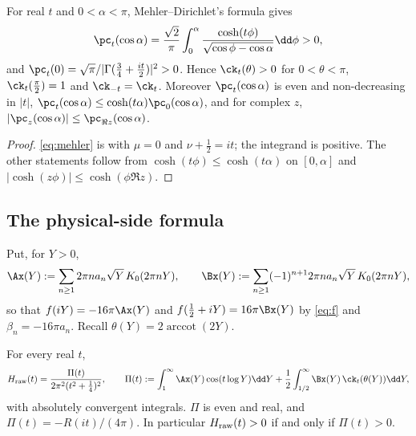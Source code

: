 \begin{theorem}\label{thm:kernel-pos}
For real $t$ and $0<\alpha<\pi$, Mehler--Dirichlet's formula \cite[14.12.1]{DLMF} gives
\begin{equation}\label{eq:mehler}
\pc_t(\cos\alpha)=\frac{\sqrt2}\pi\int_0^\alpha\frac{\cosh(t\phi)}{\sqrt{\cos\phi-\cos\alpha}}\dd\phi>0 ,
\end{equation}
and $\pc_t(0)=\sqrt\pi/|\Gamma(\frac34+\frac{it}2)|^2>0$. Hence $\ck_t(\theta)>0$ for $0<\theta<\pi$, $\ck_t(\frac\pi2)=1$ and $\ck_{-t}=\ck_t$.
Moreover $\pc_t(\cos\alpha)$ is even and non-decreasing in $|t|$, $\pc_t(\cos\alpha)\le\cosh(t\alpha)\pc_0(\cos\alpha)$, and for complex $z$,
$|\pc_z(\cos\alpha)|\le\pc_{\Re z}(\cos\alpha)$.
\end{theorem}

\begin{proof}
\eqref{eq:mehler} is \cite[14.12.1]{DLMF} with $\mu=0$ and $\nu+\frac12=it$; the integrand is positive. The other statements follow from
$\cosh(t\phi)\le\cosh(t\alpha)$ on $[0,\alpha]$ and $|\cosh(z\phi)|\le\cosh(\phi\Re z)$.
\end{proof}

\subsection{The physical-side formula}

Put, for $Y>0$,
\begin{equation}\label{eq:AB}
\Ax(Y):=\sum_{n\ge1}2\pi na_n\sqrt Y\,K_0(2\pi nY),\qquad \Bx(Y):=\sum_{n\ge1}(-1)^{n+1}2\pi na_n\sqrt Y\,K_0(2\pi nY),
\end{equation}
so that $f(iY)=-16\pi\Ax(Y)$ and $f(\frac12+iY)=16\pi\Bx(Y)$ by \eqref{eq:f} and $\beta_n=-16\pi a_n$. Recall $\theta(Y)=2\operatorname{arccot}(2Y)$.

\begin{theorem}\label{thm:F}
For every real $t$,
\begin{equation}\label{eq:physical}
H_{\rm raw}(t)=\frac{\Pi(t)}{2\pi^2(t^2+\frac14)^2},\qquad \Pi(t):=\int_1^\infty\Ax(Y)\cos(t\log Y)\dd Y+\frac12\int_{1/2}^\infty\Bx(Y)\,\ck_t(\theta(Y))\dd Y ,
\end{equation}
with absolutely convergent integrals. $\Pi$ is even and real, and $\Pi(t)=-R(it)/(4\pi)$. In particular $H_{\rm raw}(t)>0$ if and only if
$\Pi(t)>0$.
\end{theorem}

